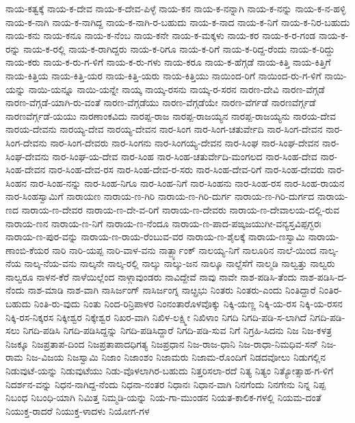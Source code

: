 {ನಾಯ-ಕತ್ವಕ್ಕೆ
ನಾಯ-ಕ-ದೇವ
ನಾಯ-ಕ-ದೇವ-ಪಿಳ್ಳೆ
ನಾಯ-ಕನ
ನಾಯ-ಕ-ನನ್ನಾಗಿ
ನಾಯ-ಕ-ನನ್ನು
ನಾಯ-ಕ-ನ-ಹಳ್ಳಿ
ನಾಯ-ಕ-ನಾಗಿ
ನಾಯ-ಕ-ನಾಗಿದ್ದ
ನಾಯ-ಕ-ನಾಗಿ-ರ-ಬಹುದು
ನಾಯ-ಕ-ನಾದ
ನಾಯ-ಕ-ನಿಗೆ
ನಾಯ-ಕ-ನಿರ-ಬಹುದು
ನಾಯ-ಕನು
ನಾಯ-ಕನೂ
ನಾಯ-ಕ-ನೆಂಬ
ನಾಯ-ಕನೇ
ನಾಯ-ಕ-ಮಕ್ಕಳು
ನಾಯ-ಕರ
ನಾಯ-ಕ-ರ-ಗಂಡ
ನಾಯ-ಕ-ರನ್ನು
ನಾಯ-ಕ-ರಲ್ಲಿ
ನಾಯ-ಕ-ರಾಗಿದ್ದರು
ನಾಯ-ಕ-ರಿಗೂ
ನಾಯ-ಕ-ರಿಗೆ
ನಾಯ-ಕ-ರಿದ್ದ-ರೆಂದು
ನಾಯ-ಕ-ರಿದ್ದು
ನಾಯ-ಕರು
ನಾಯ-ಕ-ರು-ಗ-ಳಿಗೆ
ನಾಯ-ಕ-ರು-ಗಳು
ನಾಯ-ಕರೂ
ನಾಯ-ಕ-ಹೆಗ್ಗಡೆ
ನಾಯ-ಕಿತ್ತಿ
ನಾಯ-ಕಿತ್ತಿಗೆ
ನಾಯ-ಕಿತ್ತಿಯ
ನಾಯ-ಕಿತ್ತಿ-ಯರ
ನಾಯ-ಕಿತ್ತಿ-ಯರು
ನಾಯ-ಕಿತ್ತಿಯು
ನಾಯಿಂದ-ರಿಗೆ
ನಾಯಿಂದ-ರು-ಗ-ಳಿಗೆ
ನಾಯಿ-ಯನ್ನು
ನಾಯಿ-ಯನ್ನೂ
ನಾಯಿ-ಯನ್ನೇ
ನಾಯ್ಕ
ನಾಯ್ಕ-ರಸನು
ನಾಯ್ಕ-ರ-ಸರನ
ನಾರಣ-ದೇವಿ
ನಾರಣ-ವೆಗ್ಗಡೆ
ನಾರಣ-ವೆಗ್ಗಡೆ-ಯಾಗಿ-ರು-ವಂತೆ
ನಾರಣ-ವೆಗ್ಗಡೆಯು
ನಾರಣ-ವೆಗ್ಗಡೆಯೇ
ನಾರಣ-ವೆರ್ಗಡೆ
ನಾರಣವೆರ್ಗ್ಗಡೆ
ನಾರಣವೆರ್ಗ್ಗಡೆ-ಯಯು
ನಾರಣಾಂಕವಿದು
ನಾರಪ್ಪ-ರಾಜ
ನಾರಪ್ಪ-ರಾಜಯ್ಯನ
ನಾರಪ್ಪ-ರಾಜಯ್ಯನು
ನಾರಯ-ದೇವ
ನಾರಯ-ದೇವನು
ನಾರಯ್ಯ-ದೇವ
ನಾರಯ್ಯ-ದೇವನ
ನಾರ-ಸಿಂಗ
ನಾರ-ಸಿಂಗ-ಚತುರ್ವೇದಿ
ನಾರ-ಸಿಂಗ-ದೇವನ
ನಾರ-ಸಿಂಗ-ದೇವನು
ನಾರ-ಸಿಂಗ-ದೇವರು
ನಾರ-ಸಿಂಗನು
ನಾರ-ಸಿಂಗಯ್ಯ-ದೇವನ
ನಾರ-ಸಿಂಘ
ನಾರ-ಸಿಂಘ-ದೇವನ
ನಾರ-ಸಿಂಘ-ದೇವನು
ನಾರ-ಸಿಂಘ-ಯ-ದೇವ
ನಾರ-ಸಿಂಹ
ನಾರ-ಸಿಂಹ-ಚತುರ್ವೇದಿ-ಮಂಗಲದ
ನಾರ-ಸಿಂಹ-ದೇವ
ನಾರ-ಸಿಂಹ-ದೇವನ
ನಾರ-ಸಿಂಹ-ದೇವ-ರಸ
ನಾರ-ಸಿಂಹ-ದೇವ-ರ-ಸರು
ನಾರ-ಸಿಂಹ-ದೇವ-ರಿಗೆ
ನಾರ-ಸಿಂಹ-ದೇವರು
ನಾರ-ಸಿಂಹನ
ನಾರ-ಸಿಂಹ-ನನ್ನು
ನಾರ-ಸಿಂಹ-ನಿಗೂ
ನಾರ-ಸಿಂಹ-ನಿಗೆ
ನಾರ-ಸಿಂಹನು
ನಾರ-ಸಿಂಹ-ರಸ
ನಾರ-ಸಿಂಹ-ರಾಯನ
ನಾರ-ಸಿಂಹಸ್ವಾಮಿಗೆ
ನಾರಾಯಣ
ನಾರಾಯ-ಣ-ಗಿರಿ
ನಾರಾಯ-ಣ-ಗಿರಿ-ದುರ್ಗ
ನಾರಾಯ-ಣ-ಗಿರಿ-ದುರ್ಗದ
ನಾರಾಯ-ಣದ
ನಾರಾಯ-ಣ-ದೇವರ
ನಾರಾಯ-ಣ-ದೇ-ವ-ರಿಗೆ
ನಾರಾಯ-ಣ-ದೇವರು
ನಾರಾಯ-ಣ-ದೇವಾಲಯ-ದಲ್ಲಿ-ರುವ
ನಾರಾಯ-ಣನ
ನಾರಾಯ-ಣ-ನಿಗೆ
ನಾರಾಯ-ಣ-ನೆಂದೂ
ನಾರಾಯ-ಣ-ಪಾದ-ಪಙ್ಕಜಯುಗೀ-ವನ್ಯಸ್ತವಿಪ್ಪಗ್ಭರಃ
ನಾರಾಯ-ಣ-ಪುರ-ವನ್ನು
ನಾರಾಯ-ಣ-ರಾಯ-ರೆಂಬುವ-ವರ
ನಾರಾಯ-ಣ-ಶೈಲಕ್ಕೆ
ನಾರಾಯ-ಣಸ್ವಾಮಿ
ನಾರಾಯ-ಣಾಂಬಿ-ಕೆಯರ
ನಾರಿ
ನಾರಿ-ಯಪ್ಪ
ನಾರಿ-ವಾಳ-ವನು
ನಾರ್ತ್ಬ್ಯಾಂಕ್
ನಾಲಯ್ಯ-ನಿಗೆ
ನಾಲೂರಿನ
ನಾಲೆ-ಯಿಂದ
ನಾಲ್ಕ-ನೆಯ
ನಾಲ್ಕ-ನೆಯ-ವನು
ನಾಲ್ಕನೇ
ನಾಲ್ಕ-ರಲ್ಲಿ
ನಾಲ್ಕು
ನಾಲ್ಕು-ಜನ
ನಾಲ್ಕೂ
ನಾಲ್ದೆಸೆಗೆ
ನಾಲ್ಮಡಿ
ನಾಲ್ವತ್ತು
ನಾಲ್ವರು
ನಾಲ್ವರೂ
ನಾಳನ-ಕೆರೆ
ನಾಳೆಯಿಲ್ಲೆಂದ
ನಾಳ್ಗಾವುಂಡರು
ನಾವಿದ್ದೇವೆ
ನಾವು
ನಾವೇ
ನಾಶ-ಪಡಿಸಿ-ತೆಂದು
ನಾಶ-ಪಡಿಸಿ-ದ-ನೆಂದು
ನಾಶ-ಮಾಡಿ
ನಾಶ-ವಾಗಿ
ನಾಸಿರ್ಜಂಗ್
ನಾಸಿರ್ಜಂಗ್ನ
ನಾೞ್ಪ್ರಭು
ನಿಂತರು
ನಿಂತರು-ಎಂದು
ನಿಂತಿದ್ದಾರೆ
ನಿಂತಿರ-ಬಹುದು
ನಿಂತಿ-ರು-ವುದು
ನಿಂತು
ನಿಂದ-ರಿನ್ರಿಪಾಳರ
ನಿಂನಂತಾರೊಳವೊಕ್ಕು
ನಿಕ್ಕಿ-ಯಣ್ಣ
ನಿಕ್ಕಿ-ಯ-ರಸ
ನಿಕ್ಕಿ-ಯ-ರಸನ
ನಿಕ್ಕಿ-ರಸ-ನಿಕ್ಕರಸ
ನಿಕ್ಕೀಶ್ವರ
ನಿಕ್ಕೇಶ್ವರ
ನಿಖರ-ವಾಗಿ
ನಿಖಿಳ-ಲಕ್ಷ್ಮೀ
ನಿಖಿಳಾಂ
ನಿಗದಿ
ನಿಗದಿ-ಪಡಿ-ಸ-ಲಾಗಿದೆ
ನಿಗದಿ-ಪಡಿ-ಸಲು
ನಿಗದಿ-ಪಡಿಸಿ
ನಿಗದಿ-ಪಡಿಸಿದ್ದನ್ನು
ನಿಗದಿ-ಪಡಿಸಿದ್ದಾರೆ
ನಿಗದಿ-ಪಡಿ-ಸುವ
ನಿಗೆ
ನಿಗ್ರಹಿ-ಸಿದನು
ನಿಜ
ನಿಜ-ಕಳತ್ರ
ನಿಜಕ್ಕೂ
ನಿಜಪ್ರತಾಪ-ದಿಂದ
ನಿಜಪ್ರತಾಪಾದಧಿಗತ್ಯ
ನಿಜಪ್ರಧಾನ
ನಿಜ-ರಾಜ-ಧಾನಿ
ನಿಜ-ರಾಧಾ-ನಿಮಧಿವ-ಸನ್
ನಿಜ-ರಾಮ
ನಿಜ-ವಿಜಯ
ನಿಜಸ್ವಾಮಿ
ನಿಜಾಂ
ನಿಜಾಂಶಂ
ನಿಜಾಮರು
ನಿಜಾಮ-ರೊಂದಿಗೆ
ನಿಡದವೋಲು
ನಿಡುಗಲ್ಲಿನ
ನಿಡುವುಟೆ-ಯನ್ನು
ನಿಡುವುಟೆಯು
ನಿಡು-ವೊಳಲಾಗಿರ-ಬಹುದು
ನಿತ್ತರಿಸಲಾ-ರದೆ
ನಿತ್ಯ
ನಿತ್ಯಂ
ನಿತ್ಯೋತ್ಸಾಹ-ಗ-ಳಿಗೆ
ನಿದರ್ಶನ-ವನ್ನು
ನಿಧನ-ನಾಗಿದ್ದ-ನೆಂದು
ನಿಧನಾ-ನಂತರ
ನಿಧಾನಃ
ನಿಧಾನ-ವಾಗಿ
ನಿನಗೆಂದು
ನಿನಗೇನು
ನಿನ್ನ
ನಿಪ್ಪ
ನಿಬಂಧ
ನಿಬಂಧಿ-ಯಾಗಿ
ನಿಮಿತ್ತ
ನಿಮ್ಮಡಿ-ಯನ್ನು
ನಿಯ-ಗಾ-ಮುಂಡನ
ನಿಯತ-ಕಾಲಿಕ-ಗಳಲ್ಲಿ
ನಿಯಮ-ದಂತೆ
ನಿಯುಕ್ತ-ರಾದರೆ
ನಿಯುಕ್ತ-ಳಾದಳು
ನಿಯೋಗ-ಗಳ
}
